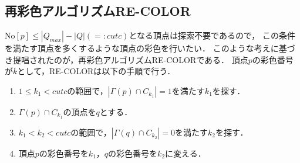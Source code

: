\subsection{再彩色アルゴリズムRE-COLOR}
$\mathrm{No}[p] \leq | Q_{max} | - |Q| (=: cutc )$となる頂点は探索不要であるので，
この条件を満たす頂点を多くするような頂点の彩色を行いたい．
このような考えに基づき提唱されたのが，再彩色アルゴリズムRE-COLORである．
頂点$p$の彩色番号が$k$として，RE-COLORは以下の手順で行う．
\begin{enumerate}
    \item $1\leq k_1 < cutc$の範囲で，$ |\Gamma( p ) \cap C_{k_1}| = 1 $を満たす$k_1$を探す．
    \item $\Gamma(p) \cap C_{k_1} $の頂点を$q$とする．
    \item $k_1 < k_2 < cutc $の範囲で，$| \Gamma( q ) \cap C_{k_2} | = 0 $を満たす$k_2$を探す．
    \item 頂点$p$の彩色番号を$k_1$，$q$の彩色番号を$k_2$に変える．
\end{enumerate}

